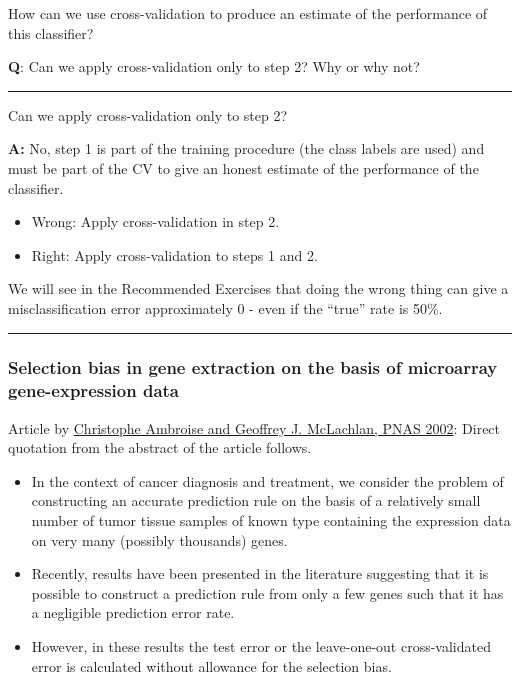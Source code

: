 \documentclass[]{article}
\providecommand{\tightlist}{%
  \setlength{\itemsep}{0pt}\setlength{\parskip}{0pt}}
\begin{document}
How can we use cross-validation to produce an estimate of the
performance of this classifier?

\textbf{Q}: Can we apply cross-validation only to step 2? Why or why
not?

\begin{center}\rule{0.5\linewidth}{\linethickness}\end{center}

Can we apply cross-validation only to step 2?

\textbf{A:} No, step 1 is part of the training procedure (the class
labels are used) and must be part of the CV to give an honest estimate
of the performance of the classifier.

\begin{itemize}
\tightlist
\item
  Wrong: Apply cross-validation in step 2.
\item
  Right: Apply cross-validation to steps 1 and 2.
\end{itemize}

We will see in the Recommended Exercises that doing the wrong thing can
give a misclassification error approximately 0 - even if the ``true''
rate is 50\%.

\begin{center}\rule{0.5\linewidth}{\linethickness}\end{center}

\hypertarget{selection-bias-in-gene-extraction-on-the-basis-of-microarray-gene-expression-data}{%
\subsubsection{Selection bias in gene extraction on the basis of
microarray gene-expression
data}\label{selection-bias-in-gene-extraction-on-the-basis-of-microarray-gene-expression-data}}

Article by \href{http://www.pnas.org/content/99/10/6562}{Christophe
Ambroise and Geoffrey J. McLachlan, PNAS 2002}: Direct quotation from
the abstract of the article follows.

\begin{itemize}
\tightlist
\item
  In the context of cancer diagnosis and treatment, we consider the
  problem of constructing an accurate prediction rule on the basis of a
  relatively small number of tumor tissue samples of known type
  containing the expression data on very many (possibly thousands)
  genes.
\item
  Recently, results have been presented in the literature suggesting
  that it is possible to construct a prediction rule from only a few
  genes such that it has a negligible prediction error rate.
\item
  However, in these results the test error or the leave-one-out
  cross-validated error is calculated without allowance for the
  selection bias.
\end{itemize}
\end{document}
